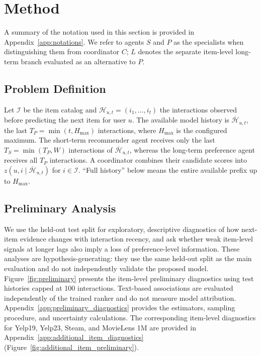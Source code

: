 ﻿\documentclass[sigconf,anonymous,review]{acmart}
\begin{document}
\section{Method}
\label{sec:method}
A summary of the notation used in this section is provided in Appendix~\ref{app:notations}.
We refer to agents $S$ and $P$ as the specialists when distinguishing them from coordinator $C$; $L$ denotes the separate item-level long-term branch evaluated as an alternative to $P$.



\subsection{Problem Definition}
Let $\mathcal I$ be the item catalog and $\mathcal H_{u,t}=(i_1,\ldots,i_t)$ the interactions observed before predicting the next item for user $u$. The available model history is $\overline{\mathcal H}_{u,t}$, the last $T_P=\min(t,H_{\max})$ interactions, where $H_{\max}$ is the configured maximum. The short-term recommender agent receives only the last $T_S=\min(T_P,W)$ interactions of $\overline{\mathcal H}_{u,t}$, whereas the long-term preference agent receives all $T_P$ interactions. A coordinator combines their candidate scores into $z(u,i\mid\overline{\mathcal H}_{u,t})$ for $i\in\mathcal I$. ``Full history'' below means the entire available prefix up to $H_{\max}$.

\subsection{Preliminary Analysis}
\label{sec:preliminary}

We use the held-out test split for exploratory, descriptive diagnostics of how next-item evidence changes with interaction recency, and ask whether weak item-level signals at longer lags also imply a loss of preference-level information. These analyses are hypothesis-generating: they use the same held-out split as the main evaluation and do not independently validate the proposed model. Figure~\ref{fig:preliminary} presents the item-level preliminary diagnostics using test histories capped at 100 interactions. Text-based associations are evaluated independently of the trained ranker and do not measure model attribution. Appendix~\ref{app:preliminary_diagnostics} provides the estimators, sampling procedure, and uncertainty calculations. The corresponding item-level diagnostics for Yelp19, Yelp23, Steam, and MovieLens 1M are provided in Appendix~\ref{app:additional_item_diagnostics} (Figure~\ref{fig:additional_item_preliminary}).
\end{document}
